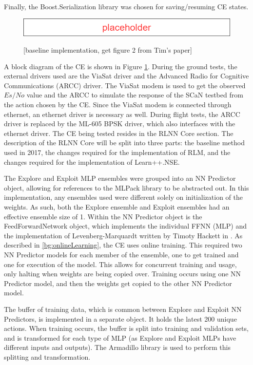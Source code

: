 \par Finally, the Boost.Serialization \cite{placeholderCitation} library was chosen for saving/resuming CE states. 
\begin{figure}
\caption{[baseline implementation, get figure 2 from Tim's paper]}
\includegraphics{figures/Placeholder.png}
\label{fig:timOutlineBlocks}
\end{figure}
\par A block diagram of the CE is shown in Figure \ref{fig:timOutlineBlocks}. During the ground tests, the external drivers used are the ViaSat driver and the Advanced Radio for Cognitive Communications (ARCC) driver. The ViaSat modem is used to get the observed $Es/No$ value and the ARCC to simulate the response of the SCaN testbed from the action chosen by the CE. Since the ViaSat modem is connected through ethernet, an ethernet driver is necessary as well. During flight tests, the ARCC driver is replaced by the ML-605 BPSK driver, which also interfaces with the ethernet driver. The CE being tested resides in the RLNN Core section. The description of the RLNN Core will be split into three parts: the baseline method used in 2017, the changes required for the implementation of RLM, and the changes required for the implementation of Learn++.NSE.
\par The Explore and Exploit MLP ensembles were grouped into an NN Predictor object, allowing for references to the MLPack library to be abstracted out. In this implementation, any ensembles used were different solely on initialization of the weights. As such, both the Explore ensemble and Exploit ensembles had an effective ensemble size of 1. Within the NN Predictor object is the FeedForwardNetwork object, which implements the individual FFNN (MLP) and the implementation of Levenberg-Marquardt written by Timoty Hackett in \cite{tim_implementation_paper}. As described in \ref{bg:onlineLearning}, the CE uses online training. This required two NN Predictor models for each member of the ensemble, one to get trained and one for execution of the model. This allows for concurrent training and usage, only halting when weights are being copied over. Training occurs using one NN Predictor model, and then the weights get copied to the other NN Predictor model. 
\par The buffer of training data, which is common between Explore and Exploit NN Predictors, is implemented in a separate object. It holds the latest 200 unique actions. When training occurs, the buffer is split into training and validation sets, and is transformed for each type of MLP (as Explore and Exploit MLPs have different inputs and outputs). The Armadillo library is used to perform this splitting and transformation.

